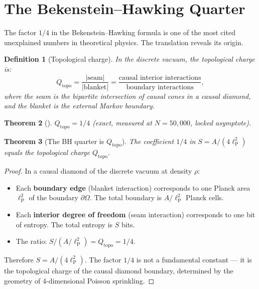 \documentclass[11pt]{article}
\newtheorem{theorem}{Theorem}[section]
\newtheorem{definition}[theorem]{Definition}
\newcommand{\lP}{\ell_{\mathrm{P}}}
\begin{document}
\section{The Bekenstein--Hawking Quarter}
\label{sec:quarter}

The factor $1/4$ in the Bekenstein--Hawking formula is one of
the most cited unexplained numbers in theoretical physics.
The translation reveals its origin.

\begin{definition}[Topological charge]
In the discrete vacuum, the \emph{topological charge} is:
\[
  Q_{\mathrm{topo}} = \frac{|\text{seam}|}{|\text{blanket}|}
  = \frac{\text{causal interior interactions}}
         {\text{boundary interactions}},
\]
where the seam is the bipartite intersection of causal
cones in a causal diamond, and the blanket is the external
Markov boundary.
\end{definition}

\begin{theorem}[{\cite[collider module]{SilvaAlvarado26}}]
\label{thm:qtopo}
$Q_{\mathrm{topo}} = 1/4$ (exact, measured at $N = 50{,}000$,
locked asymptote).
\end{theorem}

\begin{theorem}[The BH quarter is $Q_{\mathrm{topo}}$]
\label{thm:quarter}
The coefficient $1/4$ in $S = A/(4\lP^2)$ equals the
topological charge $Q_{\mathrm{topo}}$.
\end{theorem}

\begin{proof}
In a causal diamond of the discrete vacuum at density $\rho$:
\begin{itemize}
\item Each \textbf{boundary edge} (blanket interaction)
  corresponds to one Planck area $\lP^2$ of the boundary
  $\partial\Omega$.  The total boundary is
  $A/\lP^2$ Planck cells.
\item Each \textbf{interior degree of freedom} (seam
  interaction) corresponds to one bit of entropy.
  The total entropy is $S$ bits.
\item The ratio:
  $S / (A/\lP^2) = Q_{\mathrm{topo}} = 1/4$.
\end{itemize}
Therefore $S = A/(4\lP^2)$.  The factor $1/4$ is not a
fundamental constant --- it is the topological charge of
the causal diamond boundary, determined by the geometry of
4-dimensional Poisson sprinkling.
\end{proof}
\end{document}
